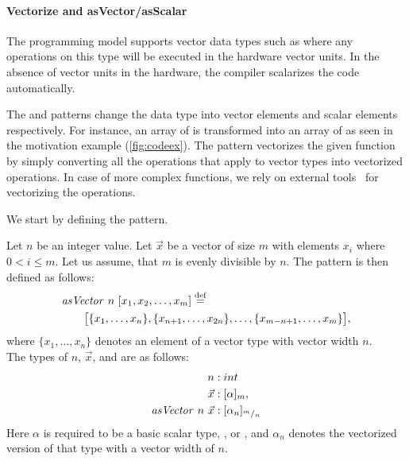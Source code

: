 \paragraph{Vectorize and asVector/asScalar}
The \OpenCL programming model supports vector data types such as  where any operations on this type will be executed in the hardware vector units.
In the absence of vector units in the hardware, the \OpenCL compiler scalarizes the code automatically.

The \asVector and \asScalar patterns change the data type into vector elements and scalar elements respectively.
For instance, an array of  is transformed into an array of  as seen in the motivation example (\autoref{fig:codeex}).
The \vect pattern vectorizes the given function by simply converting all the operations that apply to vector types into vectorized operations. 
In case of more complex functions, we rely on external tools~\cite{KarrenbergHa2011} for vectorizing the operations.

We start by defining the \asVector pattern.
\begin{definition}
  \label{definition:pattern:asVector}
  Let $n$ be an integer value.
  Let $\vec{x}$ be a vector of size $m$ with elements $x_i$ where $0 < i \leq m$.
  Let us assume, that $m$ is evenly divisible by $n$.
  The \asVector pattern is then defined as follows:
  \begin{align*}
    &\text{\textit{asVector}}\ n\ [x_1, x_2, \dots, x_m] \stackrel{\textrm{\scriptsize def}}{=} \\
    &\qquad\big[\{x_1, \ldots, x_n\}, \{x_{n+1}, \ldots, x_{2n}\}, \ldots, \{x_{m-n+1}, \ldots, x_m\}\big],
  \end{align*}
  where $\{x_1,\ldots,x_n\}$ denotes an element of a vector type with vector width $n$.\\
  The types of $n$, $\vec{x}$, and \asVector are as follows:
  \begin{align*}
    n &: int\\
    \vec{x} &: [\alpha]_m,\\
    \text{\textit{asVector}}\ n\ \vec{x} &: [\alpha_n]_{{}^m/_n}
  \end{align*}
  Here $\alpha$ is required to be a basic scalar type, \eg,  or , and $\alpha_n$ denotes the vectorized version of that type with a vector width of $n$.
\end{definition}

